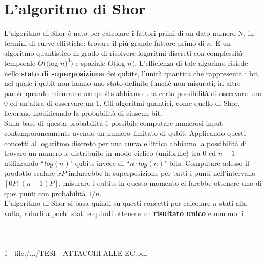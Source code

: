 \documentclass[a4paper,12pt]{tesiinfo}
\begin{document}
\section{L'algoritmo di Shor}
L'algoritmo di Shor \`e nato per calcolare i fattori primi di un dato numero N, in termini di curve ellittiche: trovare il pi\`u grande fattore primo di $n$. \`E un algoritmo quantistico in grado di risolvere logaritmi discreti con complessit\`a temporale $O(($log $n)^3)$ e spaziale $O($log $n)$. L'efficienza di tale algorimo risiede nello \textbf{stato di superposizione} dei qubits, l'unit\`a quantica che rappresenta i bit, nel quale i qubit non hanno uno stato definito funch\`e non misurati; in altre parole quando misuramo un qubits abbiamo una certa possibilit\`a di osservare uno $0$ ed un'altra di osservare un $1$. Gli algoritmi quantici, come quello di Shor, lavorano modificando la probabilit\`a di ciascun bit.
\\
Sulla base di questa probabilit\`a \`e possibile computare numerosi input contemporaneamente avendo un numero limitato di qubit. Applicando questi concetti al logaritmo discreto per una curva ellittica abbiamo la possibilit\`a di trovare un numero $x$ distribuito in modo ciclico (uniforme) tra $0$ ed $n-1$ utilizzando ``$log(n)$" qubits invece di ``$n \cdot log(n)$" bits. Computare adesso il prodotto scalare $xP$ indurrebbe la superposizione per tutti i punti nell'intervallo $[0P, (n-1)P]$, misurare i qubits in questo momento ci farebbe ottenere uno di quei punti con probabilit\`a $1 \big / n$.
\\
L'algoritmo di Shor si basa quindi su questi concetti per calcolare $n$ stati alla volta, ridurli a pochi stati e quindi ottenere un \textbf{risultato unico} e non molti.
%
%
\\
\\
\\
\\1 - file:/.../TESI - ATTACCHI ALLE EC.pdf
%
%
%
%
%
%
%
%
\end{document}
